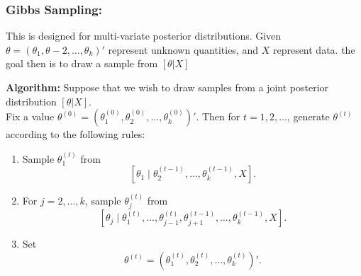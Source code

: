 \documentclass[12pt,oneside,a4paper]{book}
\theoremstyle{definition}
\theoremstyle{remark}
\begin{document}
				\subsubsection{Gibbs Sampling:}
					This is designed for multi-variate posterior distributions. Given $\theta=(\theta_1,\theta-2,\dots,\theta_k)'$ represent unknown quantities, and $X$ represent data. the goal then is to draw a sample from $[\theta|X]$

					\textbf{Algorithm:}
					Suppose that we wish to draw samples from a joint posterior distribution $[\theta|X]$.\\
					Fix a value $\theta^{(0)} = (\theta^{(0)}_1 ,\theta^{(0)}_2,\dots ,\theta^{(0)}_k)'$. Then for $t= 1,2,\dots$, generate $\theta^{(t)}$ according to the following rules:
					\begin{enumerate}
						\item Sample $\theta_1^{(t)}$ from
						\[
						[\theta_1 \mid \theta_2^{(t-1)},\ldots,\theta_k^{(t-1)},X].
						\]

						\item For $j=2,\ldots,k$, sample $\theta_j^{(t)}$ from
						\[
						[\theta_j \mid
						\theta_1^{(t)},\ldots,\theta_{j-1}^{(t)},
						\theta_{j+1}^{(t-1)},\ldots,\theta_k^{(t-1)},X].
						\]

						\item Set
						\[
						\theta^{(t)}
						=
						\left(
						\theta_1^{(t)},\theta_2^{(t)},\ldots,\theta_k^{(t)}
						\right)'.
						\]
					\end{enumerate}

\end{document}
